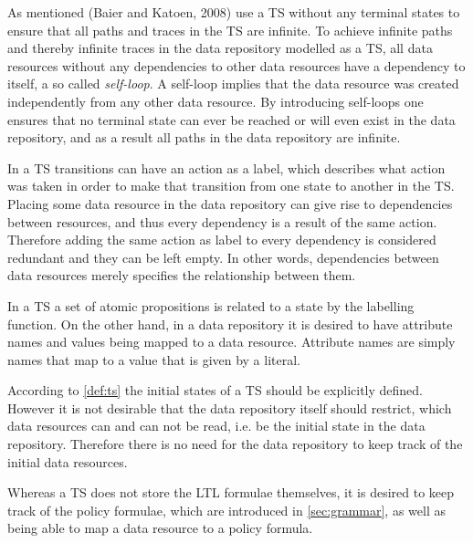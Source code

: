 As mentioned (Baier and Katoen, 2008)\cite{baier2008principles} use a TS without any terminal states to ensure that all paths and traces in the TS are infinite. To achieve infinite paths and thereby infinite traces in the data repository modelled as a TS, all data resources without any dependencies to other data resources have a dependency to itself, a so called \emph{self-loop}. A self-loop implies that the data resource was created independently from any other data resource. By introducing self-loops one ensures that no terminal state can ever be reached or will even exist in the data repository, and as a result all paths in the data repository are infinite.

In a TS transitions can have an action as a label, which describes what action was taken in order to make that transition from one state to another in the TS. Placing some data resource in the data repository can give rise to dependencies between resources, and thus every dependency is a result of the same action. Therefore adding the same action as label to every dependency is considered redundant and they can be left empty. In other words, dependencies between data resources merely specifies the relationship between them.

In a TS a set of atomic propositions is related to a state by the labelling function. On the other hand, in a data repository it is desired to have attribute names and values being mapped to a data resource. Attribute names are simply names that map to a value that is given by a literal.

According to \autoref{def:ts} the initial states of a TS should be explicitly defined. However it is not desirable that the data repository itself should restrict, which data resources can and can not be read, i.e. be the initial state in the data repository. Therefore there is no need for the data repository to keep track of the initial data resources.

Whereas a TS does not store the LTL formulae themselves, it is desired to keep track of the policy formulae, which are introduced in \autoref{sec:grammar}, as well as being able to map a data resource to a policy formula.

